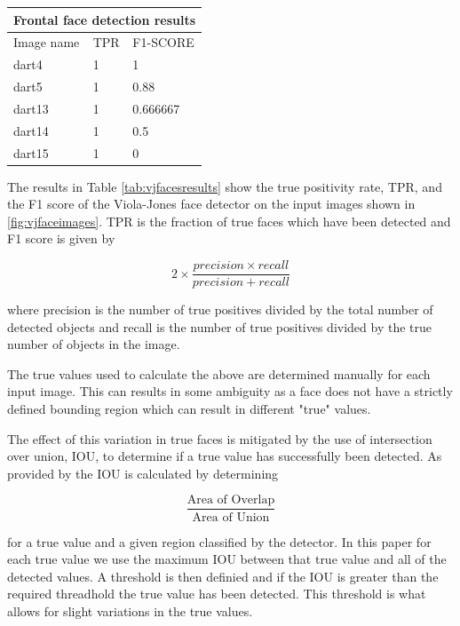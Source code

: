 \documentclass{article}
\begin{document}
\begin{multicols}{2}
\begin{center}
\begin{tabular}{ |p{2cm}||p{2cm}|p{2cm}| }
 \hline
 \multicolumn{3}{|c|}{Frontal face detection results} \\
 \hline
 Image name & TPR & F1-SCORE \\
 \hline
 dart4  & 1   & 1         \\
 dart5  & 1   & 0.88      \\
 dart13 & 1   & 0.666667  \\ 
 dart14 & 1   & 0.5       \\ 
 dart15 & 1   & 0         \\ 
 \hline
\end{tabular}
\label{tab:vjfacesresults}
\end{center}

\bigskip

The results in Table \ref{tab:vjfacesresults} show the true positivity rate, TPR, and the F1 score of the Viola-Jones face detector on the input images shown in \ref{fig:vjfaceimages}. TPR is the fraction of true faces which have been detected and F1 score is given by

\[ 2 \times \frac{precision \times recall}{precision + recall} \]

where precision is the number of true positives divided by the total number of detected objects and recall is the number of true positives divided by the true number of objects in the image.

The true values used to calculate the above are determined manually for each
input image. This can results in some ambiguity as a face does not have a
strictly defined bounding region which can result in different "true" values. 

The effect of this variation in true faces is mitigated by the use of intersection over union, IOU, to determine if a true value has successfully been detected. As provided by \cite{iou} the IOU is calculated by determining 

\[ \frac{\mbox{Area of Overlap}}{\mbox{Area of Union}}\] 

for a true value and a given region classified by the detector. In this paper
for each true value we use the maximum IOU between that true value and all of
the detected values. A threshold is then definied and if the IOU is greater
than the required threadhold the true value has been detected. This threshold
is what allows for slight variations in the true values.


\end{multicols}
\end{document}
